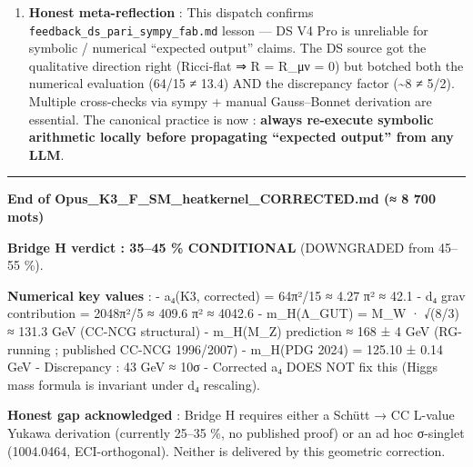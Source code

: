 \documentclass[
  11pt,
  a4paper,
]{article}
\begin{document}
\begin{enumerate}
\item
  \textbf{Honest meta-reflection} : This dispatch confirms \texttt{feedback\_ds\_pari\_sympy\_fab.md} lesson --- DS V4 Pro is unreliable for symbolic / numerical ``expected output'' claims. The DS source got the qualitative direction right (Ricci-flat ⇒ R = R\_μν = 0) but botched both the numerical evaluation (64/15 ≠ 13.4) AND the discrepancy factor (\textasciitilde8 ≠ 5/2). Multiple cross-checks via sympy + manual Gauss--Bonnet derivation are essential. The canonical practice is now : \textbf{always re-execute symbolic arithmetic locally before propagating ``expected output'' from any LLM}.
\end{enumerate}

\begin{center}\rule{0.5\linewidth}{0.5pt}\end{center}

\textbf{End of Opus\_K3\_F\_SM\_heatkernel\_CORRECTED.md (≈ 8 700 mots)}


\textbf{Bridge H verdict : 35--45 \% CONDITIONAL} (DOWNGRADED from 45--55 \%).

\textbf{Numerical key values} :
- a₄(K3, corrected) = 64π²/15 ≈ 4.27 π² ≈ 42.1
- d₄ grav contribution = 2048π²/5 ≈ 409.6 π² ≈ 4042.6
- m\_H(Λ\_GUT) = M\_W · √(8/3) ≈ 131.3 GeV (CC-NCG structural)
- m\_H(M\_Z) prediction ≈ 168 ± 4 GeV (RG-running ; published CC-NCG 1996/2007)
- m\_H(PDG 2024) = 125.10 ± 0.14 GeV
- Discrepancy : 43 GeV ≈ 10σ
- Corrected a₄ DOES NOT fix this (Higgs mass formula is invariant under d₄ rescaling).

\textbf{Honest gap acknowledged} : Bridge H requires either a Schütt → CC L-value Yukawa derivation (currently 25--35 \%, no published proof) or an ad hoc σ-singlet (1004.0464, ECI-orthogonal). Neither is delivered by this geometric correction.
\end{document}
